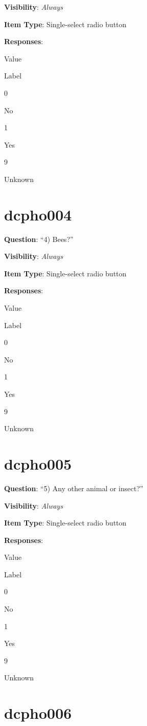 \documentclass[]{book}
\begin{document}
\textbf{Visibility}: \emph{Always}

\textbf{Item Type}: Single-select radio button

\textbf{Responses}:

Value

Label

0

No

1

Yes

9

Unknown

\hypertarget{dcpho004}{%
\section{dcpho004}\label{dcpho004}}

\textbf{Question}: ``4) Bees?''

\textbf{Visibility}: \emph{Always}

\textbf{Item Type}: Single-select radio button

\textbf{Responses}:

Value

Label

0

No

1

Yes

9

Unknown

\hypertarget{dcpho005}{%
\section{dcpho005}\label{dcpho005}}

\textbf{Question}: ``5) Any other animal or insect?''

\textbf{Visibility}: \emph{Always}

\textbf{Item Type}: Single-select radio button

\textbf{Responses}:

Value

Label

0

No

1

Yes

9

Unknown

\hypertarget{dcpho006}{%
\section{dcpho006}\label{dcpho006}}
\end{document}
